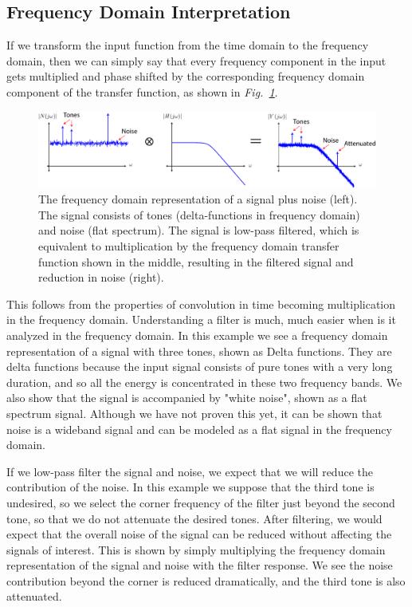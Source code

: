 \subsection{Frequency Domain Interpretation}
If we transform the input function from the time domain to the frequency domain, then we can simply say that every frequency component in the input gets multiplied and phase shifted by the corresponding frequency domain component of the transfer function, as shown in \emph{Fig.~\ref{fig:freq_domain}}.
\begin{figure}[H]
\centering
\includegraphics[width=\columnwidth]{sig_noise_freq.pdf}
\caption{The frequency domain representation of a signal plus noise (left).  The signal consists of tones (delta-functions in frequency domain) and noise (flat spectrum).  The signal is low-pass filtered, which is equivalent to multiplication by the frequency domain transfer function shown in the middle, resulting in the filtered signal and reduction in noise (right).}
\label{fig:freq_domain}
\end{figure}
This follows from the properties of convolution in time becoming multiplication in the frequency domain.  Understanding a filter is much, much easier when is it analyzed in the frequency domain.  In this example we see a frequency domain representation of a signal with three tones, shown as Delta functions.  They are delta functions because the input signal consists of pure tones with a very long duration, and so all the energy is concentrated in these two frequency bands.  We also show that the signal is accompanied by "white noise", shown as a flat spectrum signal.  Although we have not proven this yet, it can be shown that noise is a wideband signal and can be modeled as a flat signal in the frequency domain.

If we low-pass filter the signal and noise, we expect that we will reduce the contribution of the noise.  In this example we suppose that the third tone is undesired, so we select the corner frequency of the filter just beyond the second tone, so that we do not attenuate the desired tones.  After filtering,   we would expect that the overall noise of the signal can be reduced without affecting the signals of interest.  This is shown by simply multiplying the frequency domain representation of the signal and noise with the filter response.  We see the noise contribution beyond the corner is reduced dramatically, and the third tone is also attenuated.
